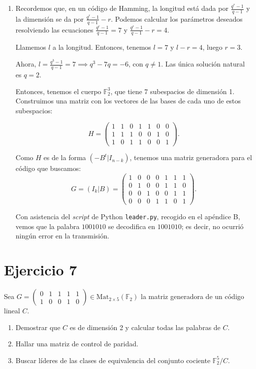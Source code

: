 \begin{enumerate}[label=\alph*)]
	\item Recordemos que, en un código de Hamming, la longitud está dada por $\frac{q^r-1}{q-1}$ y la dimensión se da por $\frac{q^r-1}{q-1}-r$. Podemos calcular los parámetros deseados resolviendo las ecuaciones $\frac{q^r-1}{q-1} = 7$ y $\frac{q^r-1}{q-1}-r = 4$.
	
	Llamemos $l$ a la longitud. Entonces, tenemos $l = 7$ y $l-r = 4$, luego $r = 3$.
	
	Ahora, $l = \frac{q^3-1}{q-1} = 7 \implies q^3 - 7q = -6$, con $q \neq 1$. Las única solución natural es $q = 2$.
	
	Entonces, tenemos el cuerpo $\mathbb{F}_2^3$, que tiene 7 subespacios de dimensión 1. Construimos una matriz con los vectores de las bases de cada uno de estos subespacios:
	
	\[H = \begin{pmatrix}
		1 & 1 & 0 & 1 & 1 & 0 & 0 \\
		1 & 1 & 1 & 0 & 0 & 1 & 0 \\
		1 & 0 & 1 & 1 & 0 & 0 & 1
	\end{pmatrix}.\]
	
	Como $H$ es de la forma $(-B^t|I_{n-k})$, tenemos una matriz generadora para el código que buscamos:
	\[G = (I_k|B) = \begin{pmatrix}
		1 & 0 & 0 & 0 & 1 & 1 & 1 \\
		0 & 1 & 0 & 0 & 1 & 1 & 0 \\
		0 & 0 & 1 & 0 & 0 & 1 & 1 \\
		0 & 0 & 0 & 1 & 1 & 0 & 1
	\end{pmatrix}.\]
	
	Con asistencia del \textit{script} de Python \texttt{leader.py}, recogido en el apéndice B, vemos que la palabra $1001010$ se decodifica en $1001010$; es decir, no ocurrió ningún error en la transmisión.
\end{enumerate}

\section{Ejercicio 7}

\begin{formulationBox}
	Sea $G = \begin{pmatrix}
		0 & 1 & 1 & 1 & 1 \\
		1 & 0 & 0 & 1 & 0
	\end{pmatrix} \in \text{Mat}_{2\times5}(\mathbb{F}_2)$ la matriz generadora de un código lineal $C$.
	
	\begin{enumerate}[label=\alph*)]
		\item Demostrar que $C$ es de dimensión 2 y calcular todas las palabras de $C$.
		\item Hallar una matriz de control de paridad.
		\item Buscar líderes de las clases de equivalencia del conjunto cociente $\mathbb{F}_2^5/C$.
	\end{enumerate}
\end{formulationBox}

